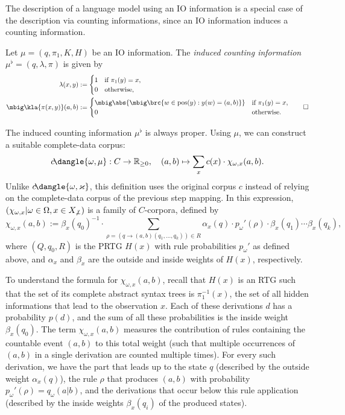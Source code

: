 The description of a language model using an IO information is a special case of
the description via counting informations, since an IO information induces a
counting information.

\begin{definition}
 Let $\mu=(q,\pi_1,K,H)$ be an IO information. The \emph{induced counting
 information} $\mu^\flat = (q,\lambda,\pi)$ is given by
 \begin{align*}
  \lambda(x,y) &:= \begin{cases}
   1 & \text{if } \pi_1(y) = x, \\
   0 & \text{otherwise},
  \end{cases} \\
  \mbig\kla{\pi(x,y)}(a,b) &:= \begin{cases}
   \mbig\abs{\mbig\brc{w\in\pos(y): y(w)=(a,b)}} & \text{if } \pi_1(y) = x, \\
   0 & \text{otherwise}.
  \end{cases}
  \qedhere
 \end{align*}
\end{definition}
The induced counting information $\mu^\flat$ is always proper.
\cite[p.~15]{bucstuvog15} Using $\mu$, we can construct a suitable complete-data corpus:
\[
 c\!\dangle{\omega,\mu}: C\to\zr_{\geq0}, \quad
 (a,b) \mapsto \sum_x c(x) \cdot \chi_{\omega,x}(a,b).
\]
Unlike $c\!\dangle{\omega,\varkappa}$, this definition uses the original corpus
$c$ instead of relying on the complete-data corpus of the previous step
mapping. In this expression, $(\chi_{\omega,x}|\omega\in\Omega,x\in
X_{\not\bot})$ is a family of $C$-corpora, defined by
\begin{equation}\label{eq:02-chi}
 \chi_{\omega,x}(a,b) := \beta_x(q_0)^{-1} \cdot \sum_{\rho = (q\to(a,b)(q_1,\ldots,q_k))\in R} \alpha_x(q) \cdot p_\omega'(\rho) \cdot \beta_x(q_1) \cdots \beta_x(q_k),
\end{equation}
where $(Q,q_0,R)$ is the PRTG $H(x)$ with rule probabilities $p_\omega'$ as defined above,
and $\alpha_x$ and $\beta_x$ are the outside and inside weights of $H(x)$, respectively.

To understand the formula for $\chi_{\omega,x}(a,b)$, recall that $H(x)$ is an
RTG such that the set of its complete abstract syntax trees is $\pi_1^{-1}(x)$,
the set of all hidden informations that lead to the observation $x$. Each of
these derivations $d$ has a probability $p(d)$, and the sum of all these
probabilities is the inside weight $\beta_x(q_0)$. The term
$\chi_{\omega,x}(a,b)$ measures the contribution of rules containing the
countable event $(a,b)$ to this total weight (such that multiple occurrences of
$(a,b)$ in a single derivation are counted multiple times). For every such
derivation, we have the part that leads up to the state $q$ (described by the
outside weight $\alpha_x(q)$), the rule $\rho$ that produces $(a,b)$ with
probability $p_\omega'(\rho) = q_\omega(a|b)$, and the derivations that occur
below this rule application (described by the inside weights $\beta_x(q_i)$ of
the produced states).

